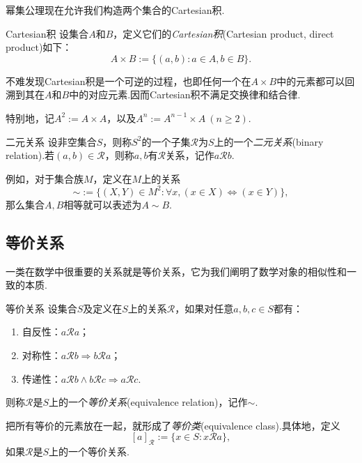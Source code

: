 幂集公理现在允许我们构造两个集合的Cartesian积.

\begin{definition}{Cartesian积}
	设集合$A$和$B$，定义它们的\textit{Cartesian积}(Cartesian product, direct product)如下：$$A \times B := \{ (a,b):a \in A,b \in B \}.$$
\end{definition}
\begin{remark}
	不难发现Cartesian积是一个可逆的过程，也即任何一个在$A \times B$中的元素都可以回溯到其在$A$和$B$中的对应元素.因而Cartesian积不满足交换律和结合律.
\end{remark}
\begin{remark}
	特别地，记$A^2:=A \times A$，以及$A^n := A^{n-1} \times A~(n \geq 2)$.
\end{remark}

\begin{definition}{二元关系}
	设非空集合$S$，则称$S^2$的一个子集$\mathcal{R}$为$S$上的一个\textit{二元关系}(binary relation).若$(a,b) \in \mathcal{R}$，则称$a,b$有$\mathcal{R}$关系，记作$a\mathcal{R}b$.
\end{definition}

例如，对于集合族$M$，定义在$M$上的关系$$\boldsymbol{\sim} := \{ (X,Y) \in M^2 : \forall x,(x \in X) \Leftrightarrow (x \in Y) \},$$
那么集合$A,B$相等就可以表述为$A \boldsymbol{\sim} B$.

\subsection{等价关系}

一类在数学中很重要的关系就是等价关系，它为我们阐明了数学对象的相似性和一致的本质.

\begin{definition}{等价关系}
	设集合$S$及定义在$S$上的关系$\mathcal{R}$，如果对任意$a,b,c \in S$都有：
	\begin{enumerate}
		\item 自反性：$a\mathcal{R} a$；
		\item 对称性：$a\mathcal{R} b \Rightarrow b\mathcal{R} a$；
		\item 传递性：$a\mathcal{R} b \wedge b\mathcal{R} c \Rightarrow a\mathcal{R} c$.
	\end{enumerate}
	则称$\mathcal{R}$是$S$上的一个\textit{等价关系}(equivalence relation)，记作$\sim$.
\end{definition}

把所有等价的元素放在一起，就形成了\textit{等价类}(equivalence class).具体地，定义$$[a]_{\mathcal{R}} := \{ x \in S:x\mathcal{R}a \},$$如果$\mathcal{R}$是$S$上的一个等价关系.


